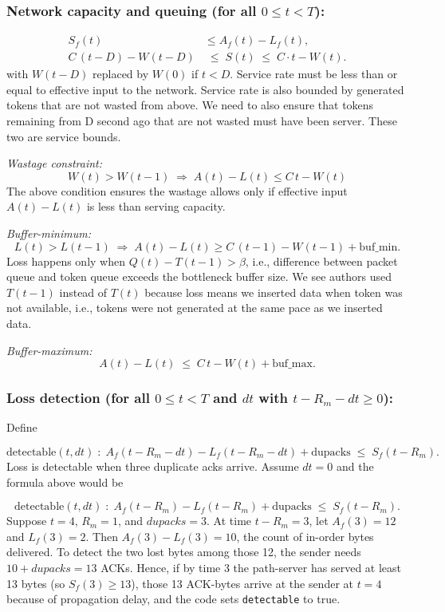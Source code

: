 \documentclass[12pt]{l4dc2023}
\begin{document}
\subsubsection{Network capacity and queuing (for all \(0\le t<T\)):}
\[
\begin{aligned}
S_f(t)&\le A_f(t)-L_f(t),\\
C\,(t-D)-W(t-D)&\;\le\;S(t)\;\le\;C\cdot t - W(t).
\end{aligned}
\]
with \(W(t-D)\) replaced by \(W(0)\) if \(t<D\). Service rate must be less than or equal to effective input to the network. Service rate is also bounded by generated tokens that are not wasted from above. We need to also ensure that tokens remaining from D second ago that are not wasted must have been server. These two are service bounds. 

\emph{Wastage constraint:}
\[
W(t)>W(t-1)\;\Longrightarrow\; A(t)-L(t)\le C\,t - W(t) 
\]
The above condition ensures the wastage allows only if effective input $A(t)-L(t)$ is less than serving capacity. 

\emph{Buffer-minimum:}
\[
L(t)>L(t-1)\;\Longrightarrow\;
A(t)-L(t)\ge C\,(t-1)-W(t-1)+\mathrm{buf\_min}.
\]
Loss happens only when $Q(t)-T(t-1)>\beta$, i.e., difference between packet queue and token queue exceeds the bottleneck buffer size. We see authors used $T(t-1)$ instead of $T(t)$ because loss means we inserted data when token was not available, i.e., tokens were not generated at the same pace as we inserted data. 
 
\emph{Buffer-maximum:}
\[
A(t)-L(t)\;\le\;C\,t - W(t) + \mathrm{buf\_max}.
\]

\subsubsection{Loss detection (for all \(0\le t<T\) and \(dt\) with \(t-R_m-dt\ge0\)):} \label{loss}

Define

\[
\mathrm{detectable}(t,dt)\;:\;
A_f(t-R_m-dt)-L_f(t-R_m-dt)+\mathrm{dupacks}
\;\le\;S_f(t-R_m).
\]
Loss is detectable when three duplicate acks arrive. Assume $dt=0$ and the formula above would be

\[
\mathrm{detectable}(t,dt)\;:\;
A_f(t-R_m)-L_f(t-R_m)+\mathrm{dupacks}
\;\le\;S_f(t-R_m).
\]
Suppose $t=4$, $R_m=1$, and $\mathit{dupacks}=3$. At time $t-R_m=3$, let $A_f(3)=12$ and $L_f(3)=2$. Then $A_f(3)-L_f(3)=10$, the count of in-order bytes delivered. To detect the two lost bytes among those 12, the sender needs $10+\mathit{dupacks}=13$ ACKs. Hence, if by time 3 the path-server has served at least 13 bytes (so $S_f(3)\ge13$), those 13 ACK-bytes arrive at the sender at $t=4$ because of propagation delay, and the code sets \texttt{detectable} to true.
\end{document}
